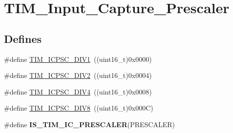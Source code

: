 \hypertarget{group__TIM__Input__Capture__Prescaler}{
\section{TIM\_\-Input\_\-Capture\_\-Prescaler}
\label{group__TIM__Input__Capture__Prescaler}
}
\subsection*{Defines}
\begin{DoxyCompactItemize}
\item 
\#define \hyperlink{group__TIM__Input__Capture__Prescaler_ga8acb44abe3147d883685c1f9f1ce410e}{TIM\_\-ICPSC\_\-DIV1}~((uint16\_\-t)0x0000)
\item 
\#define \hyperlink{group__TIM__Input__Capture__Prescaler_ga1d8a7b66add914e2ddd910d2d700978f}{TIM\_\-ICPSC\_\-DIV2}~((uint16\_\-t)0x0004)
\item 
\#define \hyperlink{group__TIM__Input__Capture__Prescaler_gaf5a675046430fa0f0c95b0dac612828f}{TIM\_\-ICPSC\_\-DIV4}~((uint16\_\-t)0x0008)
\item 
\#define \hyperlink{group__TIM__Input__Capture__Prescaler_ga5086cb03c89a5c67b199d20b605f00cb}{TIM\_\-ICPSC\_\-DIV8}~((uint16\_\-t)0x000C)
\item 
\#define {\bfseries IS\_\-TIM\_\-IC\_\-PRESCALER}(PRESCALER)
\end{DoxyCompactItemize}


